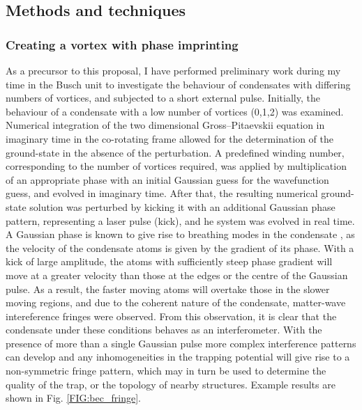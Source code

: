 \subsection{Methods and techniques}
\subsubsection{Creating a vortex with phase imprinting}
As a precursor to this proposal, I have performed preliminary work during my time in the Busch unit to investigate the behaviour of condensates with differing numbers of
vortices, and subjected to a short external pulse. Initially, the behaviour of a condensate with a low number of vortices (0,1,2) was examined.
Numerical integration of the two dimensional Gross--Pitaevskii equation in imaginary time in the co-rotating frame allowed for the
determination of the ground-state in the absence of the perturbation. A predefined winding number, corresponding to the number of vortices required, was applied by multiplication of an appropriate phase with an initial Gaussian guess for the wavefunction guess, and evolved in imaginary time. After that, the resulting numerical ground-state solution was perturbed by kicking it with an additional Gaussian phase pattern, representing a laser pulse (kick), and he system was evolved in real time. A Gaussian phase is
known to give rise to breathing modes in the condensate \cite{BEC:Kimura_pra_2002}, as the velocity of the condensate atoms is given by the
gradient of its phase. With a kick of large amplitude, the atoms with sufficiently steep phase gradient will move at a greater velocity than those at the
edges or the centre of the Gaussian pulse. As a result, the faster moving atoms will overtake those in the slower moving regions, and due to the
coherent nature of the condensate, matter-wave intereference fringes were observed. From this observation, it is clear that the condensate
under these conditions behaves as an interferometer. With the presence of more than a single Gaussian pulse more complex interference
patterns can develop and any inhomogeneities in the trapping potential will give rise to a non-symmetric fringe pattern, which may in turn be used to determine the quality of the trap, or the topology of nearby structures. Example results are shown in Fig. \ref{FIG:bec_fringe}.
